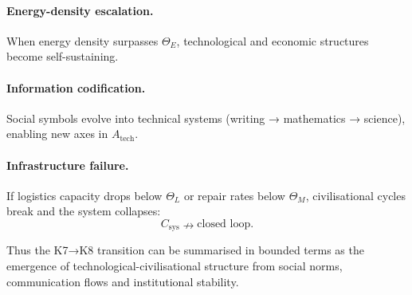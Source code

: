 \paragraph{Energy-density escalation.}
When energy density surpasses $\Theta_E$, technological and economic
structures become self-sustaining.

\paragraph{Information codification.}
Social symbols evolve into technical systems (writing → mathematics →
science), enabling new axes in $A_{\mathrm{tech}}$.

\paragraph{Infrastructure failure.}
If logistics capacity drops below $\Theta_L$ or repair rates below $\Theta_M$,
civilisational cycles break and the system collapses:
\[
C_{\mathrm{sys}} \nrightarrow \text{closed loop}.
\]

Thus the K7→K8 transition can be summarised in bounded terms as the
emergence of technological-civilisational structure from social norms,
communication flows and institutional stability.
